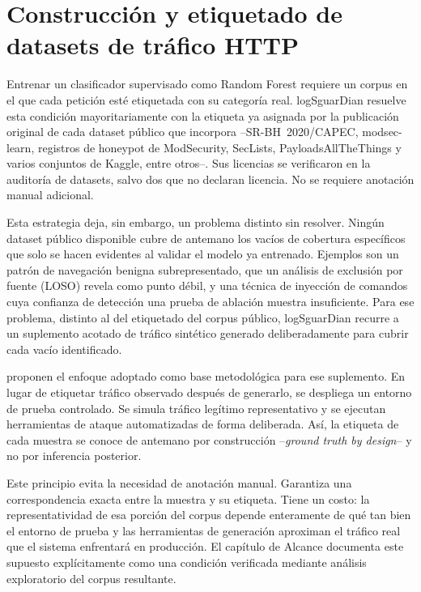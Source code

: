 \section{Construcción y etiquetado de datasets de tráfico HTTP}

Entrenar un clasificador supervisado como Random Forest requiere un corpus en el que cada petición esté etiquetada con su categoría real. logSguarDian resuelve esta condición mayoritariamente con la etiqueta ya asignada por la publicación original de cada dataset público que incorpora --SR-BH~2020/CAPEC, modsec-learn, registros de honeypot de ModSecurity, SecLists, PayloadsAllTheThings y varios conjuntos de Kaggle, entre otros--. Sus licencias se verificaron en la auditoría de datasets, salvo dos que no declaran licencia. No se requiere anotación manual adicional.

Esta estrategia deja, sin embargo, un problema distinto sin resolver. Ningún dataset público disponible cubre de antemano los vacíos de cobertura específicos que solo se hacen evidentes al validar el modelo ya entrenado. Ejemplos son un patrón de navegación benigna subrepresentado, que un análisis de exclusión por fuente (LOSO) revela como punto débil, y una técnica de inyección de comandos cuya confianza de detección una prueba de ablación muestra insuficiente. Para ese problema, distinto al del etiquetado del corpus público, logSguarDian recurre a un suplemento acotado de tráfico sintético generado deliberadamente para cubrir cada vacío identificado.

\textcite{shiravi2012} proponen el enfoque adoptado como base metodológica para ese suplemento. En lugar de etiquetar tráfico observado después de generarlo, se despliega un entorno de prueba controlado. Se simula tráfico legítimo representativo y se ejecutan herramientas de ataque automatizadas de forma deliberada. Así, la etiqueta de cada muestra se conoce de antemano por construcción --\textit{ground truth by design}-- y no por inferencia posterior.

Este principio evita la necesidad de anotación manual. Garantiza una correspondencia exacta entre la muestra y su etiqueta. Tiene un costo: la representatividad de esa porción del corpus depende enteramente de qué tan bien el entorno de prueba y las herramientas de generación aproximan el tráfico real que el sistema enfrentará en producción. El capítulo de Alcance documenta este supuesto explícitamente como una condición verificada mediante análisis exploratorio del corpus resultante.

